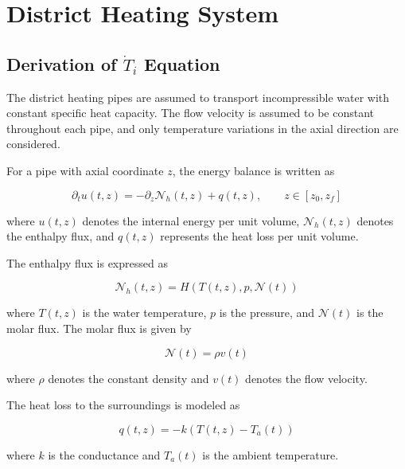 \chapter{District Heating System}

\section{Derivation of $\dot{T}_i$ Equation}
\label{sec:district_heating_temperature_derivation}

The district heating pipes are assumed to transport incompressible water with
constant specific heat capacity. The flow velocity is assumed to be constant
throughout each pipe, and only temperature variations in the axial direction
are considered.

For a pipe with axial coordinate \(z\), the energy balance is written as

\begin{equation}
    \partial_t u(t,z)
    =
    -
    \partial_z \mathcal{N}_h(t,z)
    +
    q(t,z),
    \qquad
    z \in [z_0,z_f]
\end{equation}

where \(u(t,z)\) denotes the internal energy per unit volume,
\(\mathcal{N}_h(t,z)\) denotes the enthalpy flux, and \(q(t,z)\) represents
the heat loss per unit volume.

The enthalpy flux is expressed as

\begin{equation}
    \mathcal{N}_h(t,z)
    =
    H
    \left(
        T(t,z),p,\mathcal{N}(t)
    \right)
\end{equation}

where \(T(t,z)\) is the water temperature, \(p\) is the pressure, and
\(\mathcal{N}(t)\) is the molar flux. The molar flux is given by

\begin{equation}
    \mathcal{N}(t)
    =
    \rho v(t)
\end{equation}

where \(\rho\) denotes the constant density and \(v(t)\) denotes the flow
velocity.

The heat loss to the surroundings is modeled as

\begin{equation}
    q(t,z)
    =
    -
    k
    \left(
        T(t,z)-T_a(t)
    \right)
\end{equation}

where \(k\) is the conductance and \(T_a(t)\) is the ambient temperature.

